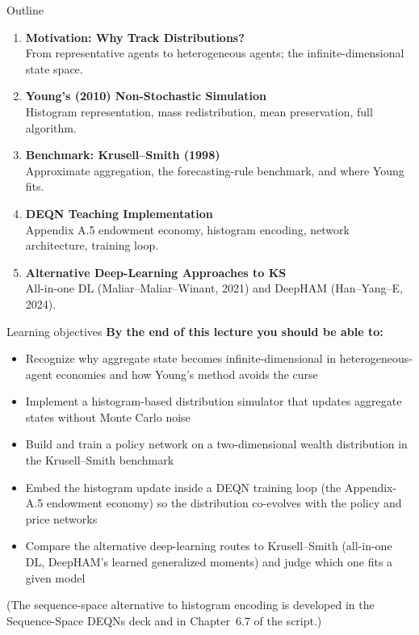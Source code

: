 \documentclass[aspectratio=169,11pt]{beamer}
\begin{document}
\begin{frame}{Outline}
\begin{enumerate}
    \item \textbf{Motivation: Why Track Distributions?}\\
    {\small From representative agents to heterogeneous agents; the infinite-dimensional state space.}

    \vspace{0.3em}
    \item \textbf{Young's (2010) Non-Stochastic Simulation}\\
    {\small Histogram representation, mass redistribution, mean preservation, full algorithm.}

    \vspace{0.3em}
    \item \textbf{Benchmark: Krusell--Smith (1998)}\\
    {\small Approximate aggregation, the forecasting-rule benchmark, and where Young fits.}

    \vspace{0.3em}
    \item \textbf{DEQN Teaching Implementation}\\
    {\small Appendix A.5 endowment economy, histogram encoding, network architecture, training loop.}

    \vspace{0.3em}
    \item \textbf{Alternative Deep-Learning Approaches to KS}\\
    {\small All-in-one DL (Maliar--Maliar--Winant, 2021) and DeepHAM (Han--Yang--E, 2024).}
\end{enumerate}
\end{frame}

\begin{frame}{Learning objectives}
\textbf{By the end of this lecture you should be able to:}
\begin{itemize}
  \item Recognize why aggregate state becomes infinite-dimensional in heterogeneous-agent economies and how Young's method avoids the curse
  \item Implement a histogram-based distribution simulator that updates aggregate states without Monte Carlo noise
  \item Build and train a policy network on a two-dimensional wealth distribution in the Krusell--Smith benchmark
  \item Embed the histogram update inside a DEQN training loop (the Appendix-A.5 endowment economy) so the distribution co-evolves with the policy and price networks
  \item Compare the alternative deep-learning routes to Krusell--Smith (all-in-one DL, DeepHAM's learned generalized moments) and judge which one fits a given model
\end{itemize}
\vspace{0.4em}
{\small (The sequence-space alternative to histogram encoding is developed in the Sequence-Space DEQNs deck and in Chapter~6.7 of the script.)}
\end{frame}
\end{document}
